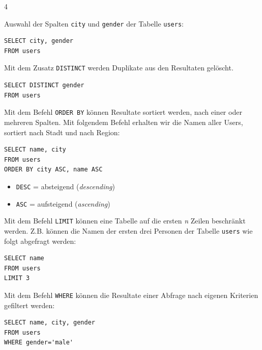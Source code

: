 \begin{landscape}
\begin{multicols*}{4}
\begin{cheatSheetBox}[title=Spalten auswählen: \texorpdfstring{\lstinline|SELECT|}{SELECT}]
Auswahl der Spalten \texttt{city} und \texttt{gender} der Tabelle \texttt{users}:
\begin{lstlisting}
SELECT city, gender
FROM users
\end{lstlisting}
\end{cheatSheetBox}

\begin{cheatSheetBox}[title=Duplikate löschen: \texorpdfstring{\lstinline|DISTINCT|}{DISTINCT}]
Mit dem Zusatz \lstinline|DISTINCT| werden Duplikate aus den Resultaten gelöscht.
\begin{lstlisting}
SELECT DISTINCT gender
FROM users
\end{lstlisting}
\end{cheatSheetBox}

\begin{cheatSheetBox}[title=Sortieren: \texorpdfstring{\lstinline|ORDER BY|}{ORDER BY}]
Mit dem Befehl \lstinline|ORDER BY| können Resultate sortiert werden, nach einer oder mehreren Spalten. Mit folgendem Befehl erhalten wir die Namen aller Users, sortiert nach Stadt und nach Region:
\begin{lstlisting}
SELECT name, city
FROM users 
ORDER BY city ASC, name ASC
\end{lstlisting}
\begin{itemize}
\item \lstinline|DESC| = absteigend (\textit{descending})
\item \lstinline|ASC| = aufsteigend (\textit{ascending})
\end{itemize}
\end{cheatSheetBox}

\begin{cheatSheetBox}[title=Erste / Letzte Zeilen: \texorpdfstring{\lstinline|LIMIT|}{LIMIT}]
Mit dem Befehl \lstinline|LIMIT| können eine Tabelle auf die ersten \textit{n} Zeilen beschränkt werden. Z.B. können die Namen der ersten drei Personen der Tabelle \texttt{users} wie folgt abgefragt werden:
\begin{lstlisting}
SELECT name
FROM users
LIMIT 3
\end{lstlisting}
\end{cheatSheetBox}

\begin{cheatSheetBox}[title=Zeilen Filtern: \texorpdfstring{\lstinline|WHERE|}{WHERE}]
Mit dem Befehl \lstinline|WHERE| können die Resultate einer Abfrage nach eigenen Kriterien gefiltert werden:
\begin{lstlisting}
SELECT name, city, gender
FROM users
WHERE gender='male'
\end{lstlisting}


\end{cheatSheetBox}
\end{multicols*}
\end{landscape}
